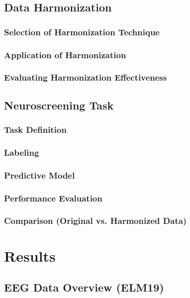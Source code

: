 \documentclass{bachelor2025eng}
\begin{document}
            

    \section{Data Harmonization}
        \subsection{Selection of Harmonization Technique}
        \subsection{Application of Harmonization}
        \subsection{Evaluating Harmonization Effectiveness}

    \section{Neuroscreening Task}
        \subsection{Task Definition}
        \subsection{Labeling}
        \subsection{Predictive Model}
        \subsection{Performance Evaluation}
        \subsection{Comparison (Original vs. Harmonized Data)}
        

\chapter{Results}
    \section{EEG Data Overview (ELM19)}
\end{document}
